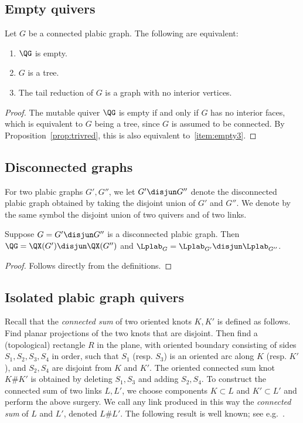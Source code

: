 \subsection{Empty quivers}
\begin{proposition}\label{prop:empty}
  Let $G$ be a connected plabic graph. The following are equivalent:
  \begin{enumerate}
  \item $\QG$ is empty.
  \item $G$ is a tree.
  \item\label{item:empty3} The tail reduction of $G$ is a graph with no interior vertices.
  \end{enumerate}
\end{proposition}
\begin{proof}
The mutable quiver $\QG$ is empty if and only if $G$ has no interior faces, which is equivalent to $G$ being a tree, since $G$ is assumed to be connected.  By Proposition~\ref{prop:trivred}, this is also equivalent to~\eqref{item:empty3}.
\end{proof}

\subsection{Disconnected graphs}
For two plabic graphs $G',G''$, we let $G'\disjun G''$ denote the disconnected plabic graph obtained by taking the disjoint union of $G'$ and $G''$. We denote by the same symbol the disjoint union of two quivers and of two links.
%
\begin{proposition}\label{prop:disc}
Suppose $G=G'\disjun G''$ is a disconnected plabic graph. Then $\QG=\QX(G')\disjun\QX(G'')$ and $\Lplab_G=\Lplab_{G'}\disjun \Lplab_{G''}$.
\end{proposition}
\begin{proof}
Follows directly from the definitions.
\end{proof}

\subsection{Isolated plabic graph quivers}
\newcommand\LHopf{L_{{\rm Hopf}}}
Recall that the \emph{connected sum} of two oriented knots $K, K'$ is defined as follows.  Find planar projections of the two knots that are disjoint.  Then find a (topological) rectangle $R$ in the plane, with oriented boundary consisting of sides $S_1,S_2,S_3,S_4$ in order, such that $S_1$ (resp. $S_3$) is an oriented arc along $K$ (resp. $K'$), and $S_2,S_4$ are disjoint from $K$ and $K'$.  The oriented connected sum knot $K \#K'$ is obtained by deleting $S_1,S_3$ and adding $S_2,S_4$.  To construct the connected sum of two links $L, L'$, we choose components $K \subset L$ and $K' \subset L'$ and perform the above surgery.  We call any link produced in this way the \emph{connected sum} of $L$ and $L'$, denoted $L \#L'$. The following result is well known; see e.g.~\cite[Proposition~16.2]{Lickorish}.

